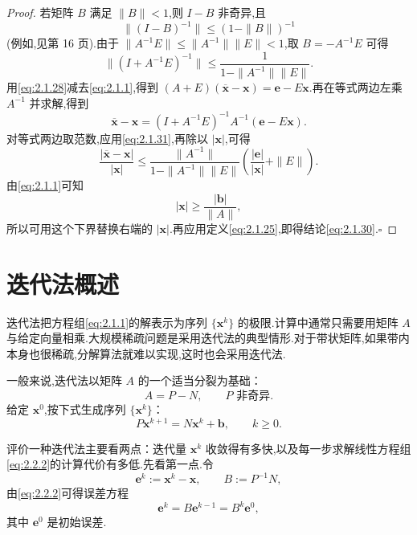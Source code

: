 \begin{proof}
若矩阵 \(B\) 满足 \(\|B\|<1\),则 \(I-B\) 非奇异,且
\[
  \|(I-B)^{-1}\|\le(1-\|B\|)^{-1}
\]
(例如,见第 16 页).由于 \(\|A^{-1}E\|\le\|A^{-1}\|\|E\|<1\),取 \(B=-A^{-1}E\) 可得
\begin{equation}\label{eq:2.1.31}
  \|(I+A^{-1}E)^{-1}\|\le\frac1{1-\|A^{-1}\|\|E\|}.
\end{equation}
用\eqref{eq:2.1.28}减去\eqref{eq:2.1.1},得到
\((A+E)(\overline{\boldsymbol{x}}-\boldsymbol{x})=\boldsymbol{e}-E\boldsymbol{x}\).再在等式两边左乘 \(A^{-1}\) 并求解,得到
\[
  \overline{\boldsymbol{x}}-\boldsymbol{x}=(I+A^{-1}E)^{-1}A^{-1}(\boldsymbol{e}-E\boldsymbol{x}).
\]
对等式两边取范数,应用\eqref{eq:2.1.31},再除以 \(|\boldsymbol{x}|\),可得
\[
  \frac{|\overline{\boldsymbol{x}}-\boldsymbol{x}|}{|\boldsymbol{x}|}
  \le\frac{\|A^{-1}\|}{1-\|A^{-1}\|\|E\|}
  \left(\frac{|\boldsymbol{e}|}{|\boldsymbol{x}|}+\|E\|\right).
\]
由\eqref{eq:2.1.1}可知
\[
  |\boldsymbol{x}|\ge\frac{|\boldsymbol{b}|}{\|A\|},
\]
所以可用这个下界替换右端的 \(|\boldsymbol{x}|\).再应用定义\eqref{eq:2.1.25},即得结论\eqref{eq:2.1.30}.\hfill\(\square\)
\end{proof}

\section{迭代法概述}\label{sec:2.2}

迭代法把方程组\eqref{eq:2.1.1}的解表示为序列 \(\{\boldsymbol{x}^k\}\) 的极限.计算中通常只需要用矩阵 \(A\) 与给定向量相乘.大规模稀疏问题是采用迭代法的典型情形.对于带状矩阵,如果带内本身也很稀疏,分解算法就难以实现,这时也会采用迭代法.

一般来说,迭代法以矩阵 \(A\) 的一个适当分裂为基础：
\begin{equation}\label{eq:2.2.1}
  A=P-N,\qquad P\text{ 非奇异.}
\end{equation}
给定 \(\boldsymbol{x}^0\),按下式生成序列 \(\{\boldsymbol{x}^k\}\)：
\begin{equation}\label{eq:2.2.2}
  P\boldsymbol{x}^{k+1}=N\boldsymbol{x}^k+\boldsymbol{b},\qquad k\ge0.
\end{equation}

评价一种迭代法主要看两点：迭代量 \(\boldsymbol{x}^k\) 收敛得有多快,以及每一步求解线性方程组\eqref{eq:2.2.2}的计算代价有多低.先看第一点.令
\begin{equation}\label{eq:2.2.3}
  \boldsymbol{e}^k:=\boldsymbol{x}^k-\boldsymbol{x},\qquad B:=P^{-1}N,
\end{equation}
由\eqref{eq:2.2.2}可得误差方程
\begin{equation}\label{eq:2.2.4}
  \boldsymbol{e}^k=B\boldsymbol{e}^{k-1}=B^k\boldsymbol{e}^0,
\end{equation}
其中 \(\boldsymbol{e}^0\) 是初始误差.

